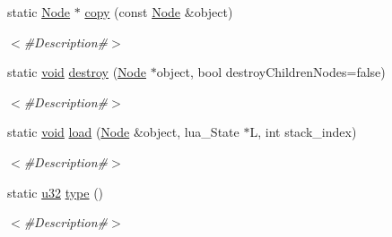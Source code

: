 \begin{DoxyCompactItemize}
static \mbox{\hyperlink{classnjli_1_1_node}{Node}} $\ast$ \mbox{\hyperlink{classnjli_1_1_node_ab05be8c908fdd34563021ac6e13e7bcb}{copy}} (const \mbox{\hyperlink{classnjli_1_1_node}{Node}} \&object)
\begin{DoxyCompactList}\small\item\em $<$\#\+Description\#$>$ \end{DoxyCompactList}\item 
static \mbox{\hyperlink{_thread_8h_af1e856da2e658414cb2456cb6f7ebc66}{void}} \mbox{\hyperlink{classnjli_1_1_node_a1dac5d53dc1ceea187d3f616e8435da7}{destroy}} (\mbox{\hyperlink{classnjli_1_1_node}{Node}} $\ast$object, bool destroy\+Children\+Nodes=false)
\begin{DoxyCompactList}\small\item\em $<$\#\+Description\#$>$ \end{DoxyCompactList}\item 
static \mbox{\hyperlink{_thread_8h_af1e856da2e658414cb2456cb6f7ebc66}{void}} \mbox{\hyperlink{classnjli_1_1_node_a5426eabdd117e6a4884baa963c5f402a}{load}} (\mbox{\hyperlink{classnjli_1_1_node}{Node}} \&object, lua\+\_\+\+State $\ast$L, int stack\+\_\+index)
\begin{DoxyCompactList}\small\item\em $<$\#\+Description\#$>$ \end{DoxyCompactList}\item 
static \mbox{\hyperlink{_util_8h_a10e94b422ef0c20dcdec20d31a1f5049}{u32}} \mbox{\hyperlink{classnjli_1_1_node_ab11572494b1cda9c05475abad2581082}{type}} ()
\begin{DoxyCompactList}\small\item\em $<$\#\+Description\#$>$ \end{DoxyCompactList}\end{DoxyCompactItemize}
